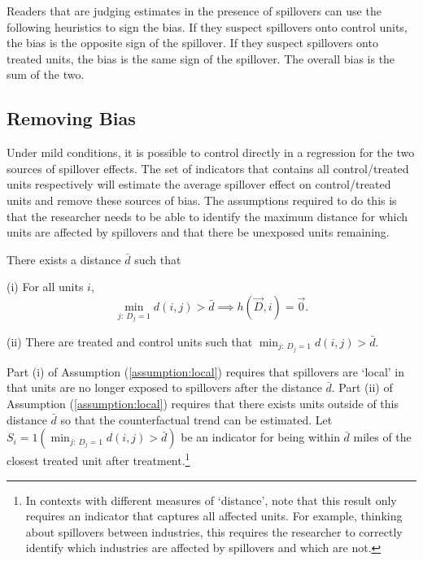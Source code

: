 \documentclass[11pt]{article}
\begin{document}
Readers that are judging estimates in the presence of spillovers can use the following heuristics to sign the bias. If they suspect spillovers onto control units, the bias is the opposite sign of the spillover. If they suspect spillovers onto treated units, the bias is the same sign of the spillover. The overall bias is the sum of the two.


\subsection{Removing Bias}\label{sec:remove_bias}

Under mild conditions, it is possible to control directly in a regression for the two sources of spillover effects. The set of indicators that contains all control/treated units respectively will estimate the average spillover effect on control/treated units and remove these sources of bias. The assumptions required to do this is that the researcher needs to be able to identify the maximum distance for which units are affected by spillovers and that there be unexposed units remaining. 

\begin{assumption}\label{assumption:local}
    There exists a distance $\bar{d}$ such that 
    
    (i) For all units $i$,
    \[ 
        \min_{j: \ D_j = 1} d(i,j) > \bar{d} \implies h(\vec{D}, i) = \vec{0}. 
    \]

    (ii) There are treated and control units such that $\min_{j: \ D_j = 1} d(i,j) > \bar{d}$.


\end{assumption}

Part (i) of Assumption (\ref{assumption:local}) requires that spillovers are `local' in that units are no longer exposed to spillovers after the distance $\bar{d}$. Part (ii) of Assumption (\ref{assumption:local}) requires that there exists units outside of this distance $\bar{d}$ so that the counterfactual trend can be estimated. Let $S_{i}= 1(\min_{j: \ D_j = 1} d(i,j) > \bar{d})$ be an indicator for being within $\bar{d}$ miles of the closest treated unit after treatment.\footnote{In contexts with different measures of `distance', note that this result only requires an indicator that captures all affected units. For example, thinking about spillovers between industries, this requires the researcher to correctly identify which industries are affected by spillovers and which are not.}
\end{document}
